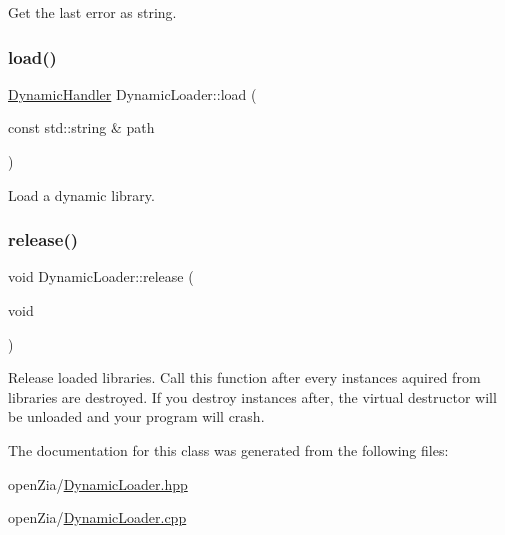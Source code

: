 Get the last error as string. 

\mbox{\label{classo_z_1_1_dynamic_loader_a1a0201ebc77bdd744aa528d7cb999a89}} 
\subsubsection{\texorpdfstring{load()}{load()}}
{\footnotesize\ttfamily \mbox{\hyperlink{namespaceo_z_acbfabf71824b5fc6a3beb64e397afc19}{Dynamic\+Handler}} Dynamic\+Loader\+::load (\begin{DoxyParamCaption}\item[{const std\+::string \&}]{path }\end{DoxyParamCaption})}



Load a dynamic library. 

\mbox{\label{classo_z_1_1_dynamic_loader_a405559cdad1b8eba0bd3bee22fa764f9}} 
\subsubsection{\texorpdfstring{release()}{release()}}
{\footnotesize\ttfamily void Dynamic\+Loader\+::release (\begin{DoxyParamCaption}\item[{void}]{ }\end{DoxyParamCaption})}



Release loaded libraries. Call this function after every instances aquired from libraries are destroyed. If you destroy instances after, the virtual destructor will be unloaded and your program will crash. 



The documentation for this class was generated from the following files\+:\begin{DoxyCompactItemize}
\item 
open\+Zia/\mbox{\hyperlink{_dynamic_loader_8hpp}{Dynamic\+Loader.\+hpp}}\item 
open\+Zia/\mbox{\hyperlink{_dynamic_loader_8cpp}{Dynamic\+Loader.\+cpp}}\end{DoxyCompactItemize}
